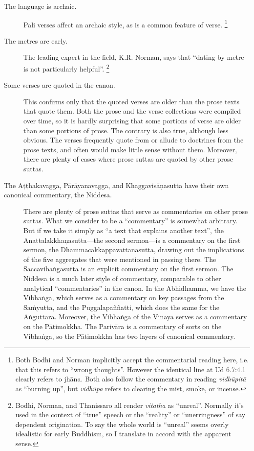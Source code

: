 \documentclass[12pt,openany]{book}%
\begin{document}
\begin{description}%
\item[The language is archaic.] Pali verses affect an archaic style, as is a common feature of verse. \footnote{Both Bodhi and Norman implicitly accept the commentarial reading here, i.e. that this refers to “wrong thoughts”. However the identical line at Ud 6.7:4.1 clearly refers to \textsanskrit{jhāna}. Both also follow the commentary in reading \textit{\textsanskrit{vidhūpitā}} as “burning up”, but \textit{\textsanskrit{vidhūpa}} refers to clearing the mist, smoke, or incense. }%
\item[The metres are early.] The leading expert in the field, K.R. Norman, says that “dating by metre is not particularly helpful”. \footnote{Bodhi, Norman, and Thanissaro all render \textit{vitatha} as “unreal”. Normally it’s used in the context of “true” speech or the “reality” or “unerringness” of say dependent origination. To say the whole world is “unreal” seems overly idealistic for early Buddhism, so I translate in accord with the apparent sense. }%
\item[Some verses are quoted in the canon.] This confirms only that the quoted verses are older than the prose texts that quote them. Both the prose and the verse collections were compiled over time, so it is hardly surprising that some portions of verse are older than some portions of prose. The contrary is also true, although less obvious. The verses frequently quote from or allude to doctrines from the prose texts, and often would make little sense without them. Moreover, there are plenty of cases where prose suttas are quoted by other prose suttas.%
\item[The \textsanskrit{Aṭṭhakavagga}, \textsanskrit{Pārāyanavagga}, and \textsanskrit{Khaggavisāṇasutta} have their own canonical commentary, the Niddesa.] There are plenty of prose suttas that serve as commentaries on other prose suttas. What we consider to be a “commentary” is somewhat arbitrary. But if we take it simply as “a text that explains another text”, the \textsanskrit{Anattalakkhaṇasutta}—the second sermon—is a commentary on the first sermon, the Dhammacakkappavattanasutta, drawing out the implications of the five aggregates that were mentioned in passing there. The \textsanskrit{Saccavibaṅgasutta} is an explicit commentary on the first sermon. The Niddesa is a much later style of commentary, comparable to other analytical “commentaries” in the canon. In the Abhidhamma, we have the \textsanskrit{Vibhaṅga}, which serves as a commentary on key passages from the \textsanskrit{Saṁyutta}, and the \textsanskrit{Puggalapaññatti}, which does the same for the \textsanskrit{Aṅguttara}. Moreover, the \textsanskrit{Vibhaṅga} of the Vinaya serves as a commentary on the \textsanskrit{Pātimokkha}. The \textsanskrit{Parivāra} is a commentary of sorts on the \textsanskrit{Vibhaṅga}, so the \textsanskrit{Pātimokkha} has two layers of canonical commentary.%

\end{description}
\end{document}
